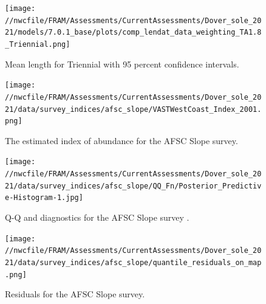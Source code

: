 \documentclass[11pt,
  english,
  a4paper,
]{article}
\begin{document}

\begin{figure}
\centering
\texttt{[image: //nwcfile/FRAM/Assessments/CurrentAssessments/Dover\_sole\_2021/models/7.0.1\_base/plots/comp\_lendat\_data\_weighting\_TA1.8\_Triennial.png]}
\caption{Mean length for Triennial with 95 percent confidence intervals.\label{fig:mean-tri-len-data}}
\end{figure}

\tagmcend\tagstructend


\begin{figure}
\centering
\texttt{[image: //nwcfile/FRAM/Assessments/CurrentAssessments/Dover\_sole\_2021/data/survey\_indices/afsc\_slope/VASTWestCoast\_Index\_2001.png]}
\caption{The estimated index of abundance for the AFSC Slope survey.\label{fig:afsc-index}}
\end{figure}

\tagmcend\tagstructend

\newpage


\begin{figure}
\centering
\texttt{[image: //nwcfile/FRAM/Assessments/CurrentAssessments/Dover\_sole\_2021/data/survey\_indices/afsc\_slope/QQ\_Fn/Posterior\_Predictive-Histogram-1.jpg]}
\caption{Q-Q and diagnostics for the AFSC Slope survey .\label{fig:afsc-qq}}
\end{figure}

\tagmcend\tagstructend

\newpage


\begin{figure}
\centering
\texttt{[image: //nwcfile/FRAM/Assessments/CurrentAssessments/Dover\_sole\_2021/data/survey\_indices/afsc\_slope/quantile\_residuals\_on\_map.png]}
\caption{Residuals for the AFSC Slope survey.\label{fig:afsc-resid}}
\end{figure}

\tagmcend\tagstructend

\end{document}
